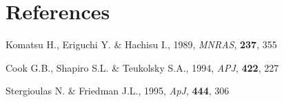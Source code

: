 \section{References}

Komatsu H., Eriguchi Y. \& Hachisu I., 1989, {\it MNRAS}, {\bf 237}, 355

\<Cook G.B., Shapiro S.L. \& Teukolsky S.A., 1994, {\it APJ}, {\bf 422}, 227

\<Stergioulas N. \& Friedman J.L., 1995, {\it ApJ}, {\bf 444}, 306




